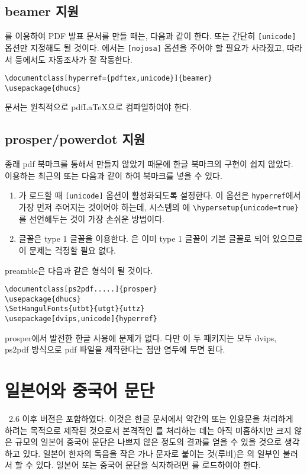 \subsection{beamer 지원}
를 이용하여 PDF 발표 문서를 만들 때는, 다음과 같이
한다. 또는 간단히 \verb|[unicode]| 옵션만 지정해도 될 것이다.
\kotex 에서는 \verb|[nojosa]| 옵션을 주어야 할
필요가 사라졌고, 따라서  등에서도 자동조사가 잘 작동한다.
\begin{Verbatim}[fontsize=\small]
\documentclass[hyperref={pdftex,unicode}]{beamer}
\usepackage{dhucs}
\end{Verbatim}
 문서는 원칙적으로 pdf\LaTeX 으로 컴파일하여야 한다.

\subsection{prosper/powerdot 지원}
종래 \는 pdf 북마크를 \을 통해서 만들지
않았기 때문에 한글 북마크의 구현이 쉽지 않았다.
\를 이용하는 최근의  또는 
다음과 같이 하여 북마크를 넣을 수 있다.
\begin{enumerate}
\item {}가 \를 로드할 때 \verb|[unicode]| 
옵션이 활성화되도록 설정한다. 이 옵션은 \verb|hyperref|에서 가장
먼저 주어지는 것이어야 하는데, 시스템의 에
\verb|\hypersetup{unicode=true}|를 선언해두는 것이 가장
손쉬운 방법이다.
\item 글꼴은 type 1 글꼴을 이용한다. \kotex 은 이미 type 1 글꼴이
기본 글꼴로 되어 있으므로 이 문제는 걱정할 필요 없다.
\end{enumerate}

preamble은 다음과 같은 형식이 될 것이다.
\begin{Verbatim}[fontsize=\small]
\documentclass[ps2pdf.....]{prosper}
\usepackage{dhucs}
\SetHangulFonts{utbt}{utgt}{uttz}
\usepackage[dvips,unicode]{hyperref}
\end{Verbatim}

prosper에서 발전한 \는 한글 사용에 문제가 없다.
다만 이 두 패키지는 모두 dvips, ps2pdf 방식으로 pdf 파일을
제작한다는 점만 염두에 두면 된다.


\section{일본어와 중국어 문단}

\thispkg\ 2.6 이후 버전은 \을 포함하였다.
이것은 한글 문서에서 약간의  또는  인용문을 처리하게 하려는
목적으로 제작된 것으로서 본격적인 를 처리하는 데는 아직
미흡하지만 크지 않은 규모의 일본어 중국어 문단은 나쁘지 않은 정도의
결과를 얻을 수 있을 것으로 생각하고 있다.
일본어 한자의 독음을 작은 가나 문자로 붙이는 것(루비)은 의
일부인 \를 불러서 할 수 있다. 
일본어 또는 중국어 문단을 식자하려면 를
로드하여야 한다.

